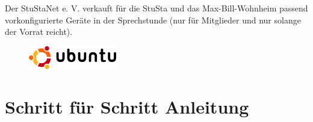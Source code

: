 \documentclass[a4paper,12pt]{scrartcl}
\begin{document}
\vspace{2em}

Der StuStaNet e. V. verkauft für die StuSta und das Max-Bill-Wohnheim passend vorkonfigurierte Geräte in der Sprechstunde (nur für Mitglieder und nur solange der Vorrat reicht).


\newpage
\enlargethispage{20pt}

\begin{figure}[t!]
    \raggedleft
    \vspace{-20pt}
    \includegraphics[height=1cm,keepaspectratio]{Bilder/Ubuntu_logo}
    \vspace{-30pt}
\end{figure}

\section*{Schritt für Schritt Anleitung}
\end{document}
